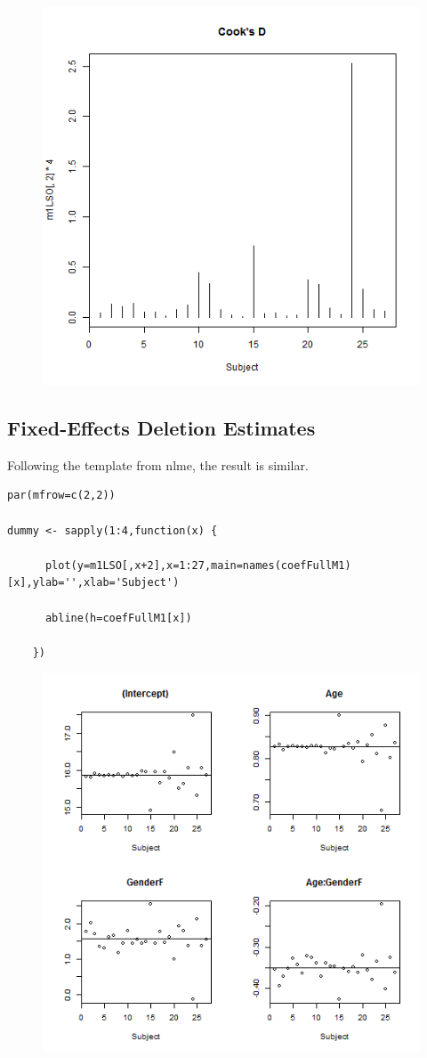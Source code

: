 \documentclass[a4paper,12pt]{article}
\begin{document}
\begin{figure}
	\centering
	\includegraphics[width=0.7\linewidth]{images/RbloggersPNG1}
	\caption{}
	\label{fig:RbloggersPNG2}
\end{figure}




\subsection{Fixed-Effects Deletion Estimates}

Following the template from nlme, the result is similar. 

\begin{framed}
	\begin{verbatim}
par(mfrow=c(2,2))

dummy <- sapply(1:4,function(x) {

      plot(y=m1LSO[,x+2],x=1:27,main=names(coefFullM1)[x],ylab='',xlab='Subject')

      abline(h=coefFullM1[x])

    })

\end{verbatim}
\end{framed}


\begin{figure}
\centering
\includegraphics[width=0.7\linewidth]{images/RbloggersPNG2}
\caption{}
\label{fig:RbloggersPNG2}
\end{figure}
\end{document}
